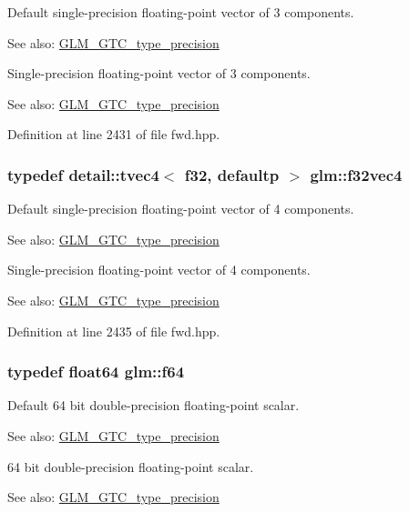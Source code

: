 Default single-precision floating-point vector of 3 components. \begin{Desc}
\item[See also:]\hyperlink{group__gtc__type__precision}{GLM\_\-GTC\_\-type\_\-precision}\end{Desc}
Single-precision floating-point vector of 3 components. \begin{Desc}
\item[See also:]\hyperlink{group__gtc__type__precision}{GLM\_\-GTC\_\-type\_\-precision} \end{Desc}


Definition at line 2431 of file fwd.hpp.\hypertarget{group__gtc__type__precision_gb6254ab9d409cce6579d7dc75dd34114}{
\subsubsection[f32vec4]{\setlength{\rightskip}{0pt plus 5cm}typedef detail::tvec4$<$ f32, defaultp $>$ {\bf glm::f32vec4}}}
\label{group__gtc__type__precision_gb6254ab9d409cce6579d7dc75dd34114}


Default single-precision floating-point vector of 4 components. \begin{Desc}
\item[See also:]\hyperlink{group__gtc__type__precision}{GLM\_\-GTC\_\-type\_\-precision}\end{Desc}
Single-precision floating-point vector of 4 components. \begin{Desc}
\item[See also:]\hyperlink{group__gtc__type__precision}{GLM\_\-GTC\_\-type\_\-precision} \end{Desc}


Definition at line 2435 of file fwd.hpp.\hypertarget{group__gtc__type__precision_g2bba392e555124b36cde6abba349bab3}{
\subsubsection[f64]{\setlength{\rightskip}{0pt plus 5cm}typedef float64 {\bf glm::f64}}}
\label{group__gtc__type__precision_g2bba392e555124b36cde6abba349bab3}


Default 64 bit double-precision floating-point scalar. \begin{Desc}
\item[See also:]\hyperlink{group__gtc__type__precision}{GLM\_\-GTC\_\-type\_\-precision}\end{Desc}
64 bit double-precision floating-point scalar. \begin{Desc}
\item[See also:]\hyperlink{group__gtc__type__precision}{GLM\_\-GTC\_\-type\_\-precision} \end{Desc}


